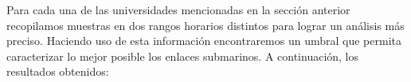 





Para cada una de las universidades mencionadas en la sección anterior recopilamos muestras en dos rangos horarios distintos para lograr un análisis más preciso. Haciendo uso de esta información encontraremos un umbral que permita caracterizar lo mejor posible los enlaces submarinos. A continuación, los resultados obtenidos:

